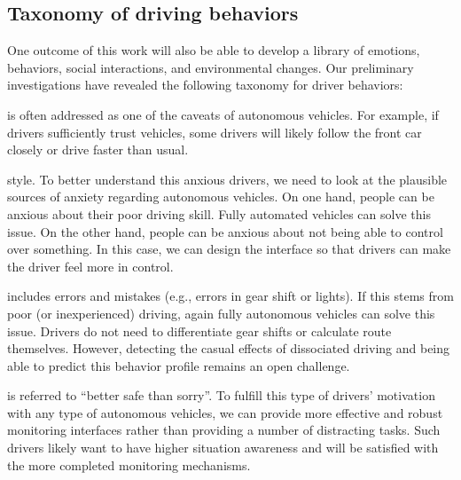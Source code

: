 \subsection{Taxonomy of driving behaviors}
One outcome of this work will also be able to develop a library of emotions, behaviors, social interactions, and environmental changes. 
Our preliminary investigations have revealed the following taxonomy for driver behaviors:

 is often addressed as one of the caveats of autonomous vehicles. For example, if drivers sufficiently trust vehicles, some drivers will likely follow the front car closely or drive faster than usual. 

 style. To better understand this anxious drivers, we need to look at the plausible sources of anxiety regarding autonomous vehicles. On one hand, people can be anxious about their poor driving skill. Fully automated vehicles can solve this issue. On the other hand, people can be anxious about not being able to control over something. In this case, we can design the interface so that drivers can make the driver feel more in control.

 includes errors and mistakes (e.g., errors in gear shift or lights). If this stems from poor (or inexperienced) driving, again fully autonomous vehicles can solve this issue. Drivers do not need to differentiate gear shifts or calculate route themselves. However, detecting the casual effects of dissociated driving and being able to predict this behavior profile remains an open challenge.


 is referred to ``better safe than sorry''. 
To fulfill this type of drivers' motivation with any type of autonomous vehicles, we can provide more effective and robust monitoring interfaces rather than providing a number of distracting tasks. Such drivers likely want to have higher situation awareness and will be satisfied with the more completed monitoring mechanisms.

